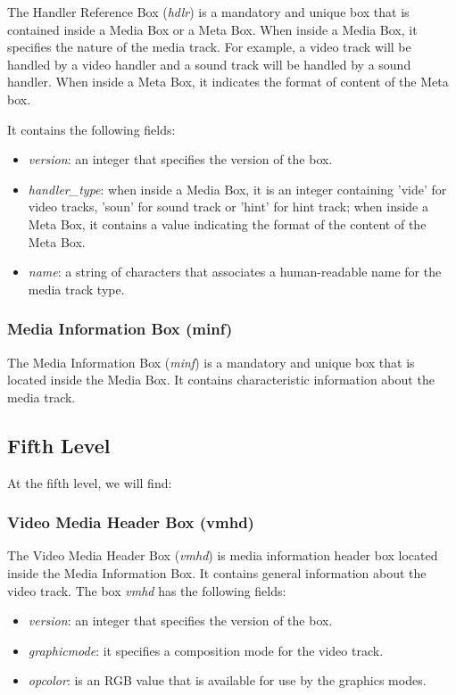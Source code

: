 The Handler Reference Box (\emph{hdlr}) is a mandatory and unique box that is contained inside a Media Box or a Meta Box. When inside a Media Box, it specifies the nature of the media track. For example, a video track will be handled by a video handler and a sound track will be handled by a sound handler. When inside a Meta Box, it indicates the format of content of the Meta box.

It contains the following fields:

\begin{itemize}
\item \emph{version}: an integer that specifies the version of the box.
\item \emph{handler\_type}: when inside a Media Box, it is an integer containing 'vide' for video tracks, 'soun' for sound track or 'hint' for hint track; when inside a Meta Box,  it contains a value indicating the format of the content of the Meta Box.
\item \emph{name}: a string of characters that associates a human-readable name for the media track type.
\end{itemize} 

\subsubsection*{Media Information Box (minf)}

The Media Information Box (\emph{minf}) is a mandatory and unique box that is located inside the Media Box. It contains characteristic information about the media track.

\subsection{Fifth Level}

At the fifth level, we will find:

\subsubsection*{Video Media Header Box (vmhd)}

The Video Media Header Box (\emph{vmhd}) is media information header box located inside the Media Information Box. It contains general information about the video track. The box \emph{vmhd} has the following fields:

\begin{itemize}
\item \emph{version}: an integer that specifies the version of the box.
\item \emph{graphicmode}: it specifies a composition mode for the video track.
\item \emph{opcolor}: is an RGB value that is available for use by the graphics modes.
\end{itemize}

